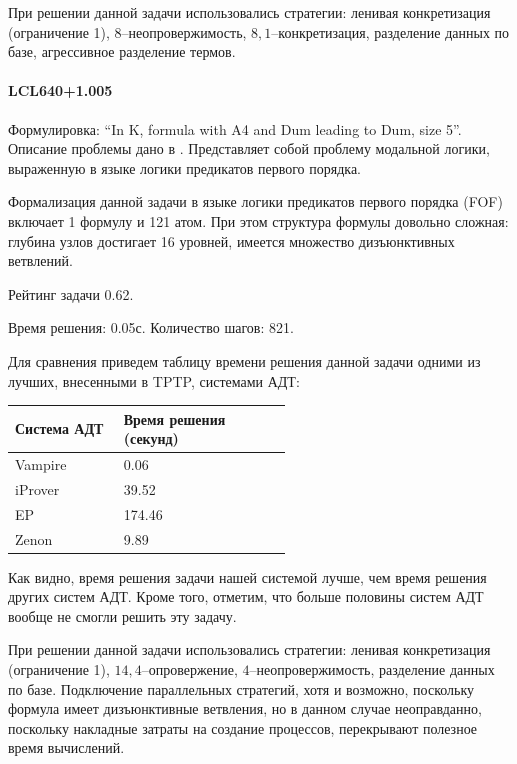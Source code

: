 При решении данной задачи использовались стратегии: ленивая конкретизация (ограничение 1), $8$--неопровержимость, $8,1$--конкретизация, разделение данных по базе, агрессивное разделение термов.


\paragraph{LCL640+1.005}
Формулировка: ``In K, formula with A4 and Dum leading to Dum, size 5''. Описание проблемы дано в \cite{SourceLCL}. Представляет собой проблему модальной логики, выраженную в языке логики предикатов первого порядка.

Формализация данной задачи в языке логики предикатов первого порядка (FOF) включает 1 формулу и 121 атом. При этом структура формулы довольно сложная: глубина узлов достигает 16 уровней, имеется множество дизъюнктивных ветвлений.

Рейтинг задачи 0.62. %

Время решения: 0.05с. Количество шагов: 821.

Для сравнения приведем таблицу времени решения данной задачи одними из лучших, внесенными в TPTP, системами АДТ:

\begin{longtable}[H]{|p{0.2\linewidth}|p{0.35\linewidth}|}
\hline
\textbf{Система АДТ} & \textbf{Время решения (секунд)}  \\
\hline
Vampire & 0.06 \\
\hline
iProver & 39.52 \\
\hline
EP & 174.46  \\
\hline
Zenon & 9.89 \\
\hline
\end{longtable}


Как видно, время решения задачи нашей системой лучше, чем время решения других систем АДТ. Кроме того, отметим, что больше половины систем АДТ вообще не смогли решить эту задачу.

При решении данной задачи использовались стратегии: ленивая конкретизация (ограничение 1), $14,4$--опровержение, $4$--неопровержимость, разделение данных по базе. Подключение параллельных стратегий, хотя и возможно, поскольку формула имеет дизъюнктивные ветвления, но в данном случае неоправданно, поскольку накладные затраты на создание процессов, перекрывают полезное время вычислений.




